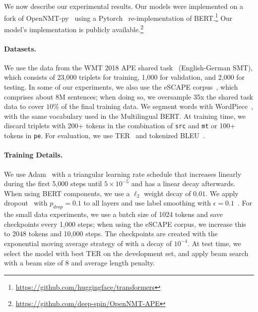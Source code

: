 We now describe our experimental results. Our models were implemented
on a fork of OpenNMT-py~\citep{klein2017opennmt} using a
Pytorch~\citep{pytorch} re-implementation of
BERT.\footnote{\url{https://github.com/huggingface/transformers}}
Our model's implementation is publicly
available.\footnote{\url{https://github.com/deep-spin/OpenNMT-APE}}

\paragraph*{Datasets.}
We use the data from the WMT 2018 APE shared
task~\citep{Chatterjee2018} (English-German SMT), which consists of
23,000 triplets for training, 1,000 for validation, and 2,000 for
testing. In some of our experiments, we also use the eSCAPE
corpus~\citep{negri2018escape}, which comprises about 8M sentences;
when doing so, we oversample 35x the shared task data to cover $10\%$
of the final training data. We segment words with
WordPiece~\citep{wu2016google}, with the same vocabulary used in the
Multilingual BERT. At training time, we discard triplets with 200+
tokens in the combination of {\tt src} and {\tt mt} or 100+ tokens in
  {\tt pe}. For evaluation, we use TER~\citep{snover2006study} and
tokenized BLEU~\citep{papineni2002bleu}.

\paragraph*{Training Details.}
We use Adam~\citep{kingma2014adam} with a triangular learning rate
schedule that increases linearly during the first 5,000 steps until
$5\times 10^{-5}$ and has a linear decay afterwards. When using BERT
components, we use a $\ell_2$ weight decay of $0.01$. We apply
dropout~\citep{srivastava2014dropout} with $p_{drop}=0.1$ to all
layers and use label smoothing with
$\epsilon=0.1$~\citep{pereyra2017regularizing}. For the small data
experiments, we use a batch size of 1024 tokens and save checkpoints
every 1,000 steps; when using the eSCAPE corpus, we increase this to
2048 tokens and 10,000 steps. The checkpoints are created with the
exponential moving average strategy of \citet{junczys2018marian}
with a decay of $10^{-4}$. At test time, we select the model with
best TER on the development set, and apply beam search with a beam
size of 8 and average length penalty.

